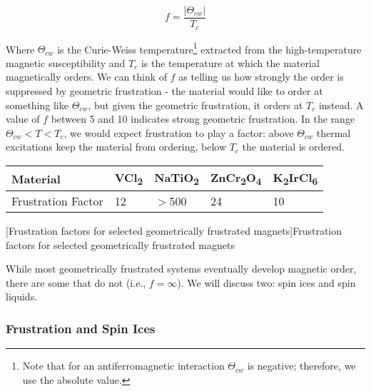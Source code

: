 \begin{equation}
f = \frac{|\Theta_{cw}|}{T_{c}}
\end{equation}

Where $\Theta_{cw}$ is the Curie-Weiss temperature\footnote{Note that for an antiferromagnetic interaction $\Theta_{cw}$ is negative; therefore, we use the absolute value.} extracted from the high-temperature magnetic susceptibility and $T_{c}$ is the temperature at which the material magnetically orders. We can think of $f$ as telling us how strongly the order is suppressed by geometric frustration - the material would like to order at something like $\Theta_{cw}$, but given the geometric frustration, it orders at $T_{c}$ instead. A value of $f$ between 5 and 10 indicates strong geometric frustration. In the range $\Theta_{cw} < T < T_{c}$, we would expect frustration to play a factor: above $\Theta_{cw}$ thermal excitations keep the material from ordering, below $T_{c}$ the material is ordered.

\begin{center}
	\begin{tabular}{l | l | l | l | l}
		\hline
		\hline
		Material & VCl\textsubscript{2} & NaTiO\textsubscript{2} & ZnCr\textsubscript{2}O\textsubscript{4} & K\textsubscript{2}IrCl\textsubscript{6}\\ \hline
		Frustration Factor & 12 & $>$500 & 24 & 10\\ \hline \hline
	\end{tabular}
	[Frustration factors for selected geometrically frustrated magnets]{Frustration factors for selected geometrically frustrated magnets \cite{Ramirez1994}}\label{tbl:frustratedmagens}
\end{center}

While most geometrically frustrated systems eventually develop magnetic order, there are some that do not (i.e., $f = \infty$). We will discuss two: spin ices and spin liquids.

\subsubsection{Frustration and Spin Ices}

